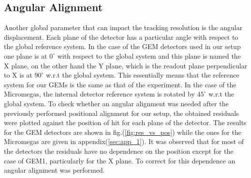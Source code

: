 \subsection[Angular Alignment]%
{Angular Alignment} %
Another global parameter that can impact the tracking resolution is the angular displacement. Each plane of the detector has a particular angle with respect to the global reference system. In the case of the GEM detectors used in our setup one plane is at $0^{\circ}$ with respect to the global system and this plane is named the X plane, on the other hand the Y plane, which is the readout plane perpendicular to X is at $90^{\circ}$ w.r.t the global system. This essentially means that the reference system for our GEMs is the same as that of the experiment. In the case of the Micromegas, the internal detector reference system is rotated by $45^{\circ}$ w.r.t the global system. To check whether an angular alignment was needed after the previously performed positional alignment for our setup, the obtained residuals were plotted against the position of hit for each plane of the detector. The results for the GEM detectors are shown in fig.(\ref{fig:res_vs_pos}) while the ones for the Micromegas are given in appendix(\ref{sec:app_1}). It was observed that for most of the detectors the residuals have no dependence on the position except for the case of GEM1, particularly for the X plane. To correct for this dependence an angular alignment was performed.

